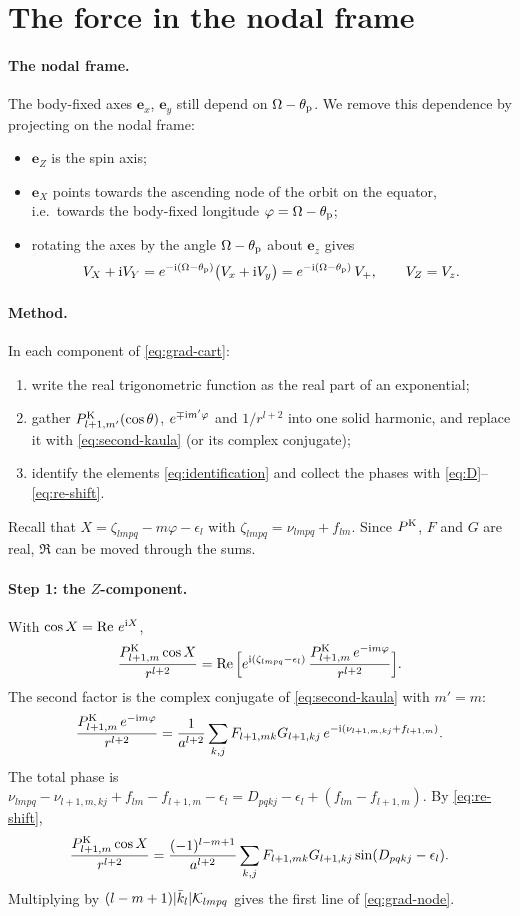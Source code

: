 \section{The force in the nodal frame}
\paragraph{The nodal frame.} The body-fixed axes $\mathbf e_x$, $\mathbf e_y$ still depend on $\Omega-\theta_{\mathrm p}$. We remove this dependence by projecting on the nodal frame:
\begin{itemize}
  \item $\mathbf e_Z$ is the spin axis;
  \item $\mathbf e_X$ points towards the ascending node of the orbit on the equator, i.e.\ towards the body-fixed longitude $\varphi=\Omega-\theta_{\mathrm p}$;
  \item rotating the axes by the angle $\Omega-\theta_{\mathrm p}$ about $\mathbf e_z$ gives
  \begin{equation}
    V_X+\mathrm{i} V_Y=e^{-\mathrm{i}(\Omega-\theta_{\mathrm p})}\big(V_x+\mathrm{i} V_y\big)=e^{-\mathrm{i}(\Omega-\theta_{\mathrm p})}\,V_+,\qquad V_Z=V_z. \label{eq:nodal-rot}
  \end{equation}
\end{itemize}

\paragraph{Method.} In each component of \eqref{eq:grad-cart}:
\begin{enumerate}
  \item write the real trigonometric function as the real part of an exponential;
  \item gather $P^{\mathrm K}_{l+1,m'}(\cos\theta)$, $e^{\mp\mathrm{i} m'\varphi}$ and $1/r^{l+2}$ into one solid harmonic, and replace it with \eqref{eq:second-kaula} (or its complex conjugate);
  \item identify the elements \eqref{eq:identification} and collect the phases with \eqref{eq:D}--\eqref{eq:re-shift}.
\end{enumerate}
Recall that $X=\zeta_{lmpq}-m\varphi-\epsilon_l$ with $\zeta_{lmpq}=\nu_{lmpq}+f_{lm}$. Since $P^{\mathrm K}$, $F$ and $G$ are real, $\Re$ can be moved through the sums.

\paragraph{Step 1: the $Z$-component.} With $\cos X=\operatorname{Re}\,e^{\mathrm{i} X}$,
\[
  \frac{P^{\mathrm K}_{l+1,m}\cos X}{r^{l+2}}=\operatorname{Re}\Big[e^{\mathrm{i}(\zeta_{lmpq}-\epsilon_l)}\,\frac{P^{\mathrm K}_{l+1,m}\,e^{-\mathrm{i} m\varphi}}{r^{l+2}}\Big].
\]
The second factor is the complex conjugate of \eqref{eq:second-kaula} with $m'=m$:
\[
  \frac{P^{\mathrm K}_{l+1,m}\,e^{-\mathrm{i} m\varphi}}{r^{l+2}}=\frac{1}{a^{l+2}}\sum_{k,j}F_{l+1,mk}G_{l+1,kj}\,e^{-\mathrm{i}(\nu_{l+1,m,kj}+f_{l+1,m})}.
\]
The total phase is $\nu_{lmpq}-\nu_{l+1,m,kj}+f_{lm}-f_{l+1,m}-\epsilon_l=D_{pqkj}-\epsilon_l+(f_{lm}-f_{l+1,m})$. By \eqref{eq:re-shift},
\[
  \frac{P^{\mathrm K}_{l+1,m}\cos X}{r^{l+2}}=\frac{(-1)^{l-m+1}}{a^{l+2}}\sum_{k,j}F_{l+1,mk}G_{l+1,kj}\sin(D_{pqkj}-\epsilon_l).
\]
Multiplying by $(l-m+1)|\bar k_l|\mathcal K_{lmpq}$ gives the first line of \eqref{eq:grad-node}.

